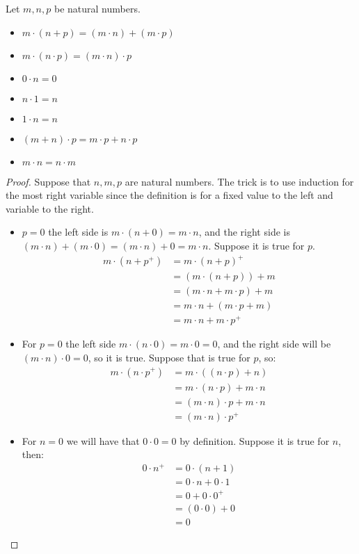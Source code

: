 \documentclass{tufte-handout}
\begin{document}
\begin{theorem}
	Let $m, n, p$ be natural numbers.
	\begin{itemize}
		\item $m \cdot (n + p) = (m \cdot n) + (m \cdot p)$
		\item $m \cdot (n \cdot p) = (m \cdot n) \cdot p$
		\item $0 \cdot n = 0$
		\item $n \cdot 1 = n$
		\item $1 \cdot n = n$
		\item $(m + n) \cdot p = m \cdot p + n \cdot p$
		\item $m \cdot n = n \cdot m$
	\end{itemize}
\end{theorem}
\begin{proof}
	Suppose that $n, m, p$ are natural numbers. The trick is to use induction for the most right variable since the definition is for a fixed value to the left and variable to the right.
	\begin{itemize}
		\item $p = 0$ the left side is $m \cdot (n + 0) = m \cdot n$, and the right side is $(m \cdot n) + (m \cdot 0) = (m\cdot n) + 0 = m\cdot n$. Suppose it is true for $p$.
		\begin{align*}
			m \cdot (n + p^+) &= m \cdot (n + p)^+\\
			&= (m \cdot (n + p)) + m\\
			&= (m \cdot n + m \cdot p) + m\\
			&= m \cdot n + (m \cdot p + m)\\
			&= m \cdot n + m \cdot p^+
		\end{align*}

		\item For $p = 0$ the left side $m \cdot (n \cdot 0) = m \cdot 0 = 0$, and the right side will be $(m \cdot n) \cdot 0 = 0$, so it is true. Suppose that is true for $p$, so:
		\begin{align*}
			m \cdot (n \cdot p^+) &= m \cdot ((n \cdot p) + n)\\
			&= m \cdot (n \cdot p) + m \cdot n\\
			&= (m \cdot n) \cdot p + m \cdot n\\
			&= (m \cdot n) \cdot p^+
		\end{align*}

		\item For $n = 0$ we will have that $0 \cdot 0 = 0$ by definition. Suppose it is true for $n$, then:
		\begin{align*}
			0 \cdot n^+ &= 0 \cdot (n + 1)\\
			&= 0 \cdot n + 0 \cdot 1\\
			&= 0 + 0 \cdot 0^+\\
			&= (0 \cdot 0) + 0\\
			&= 0
		\end{align*}


\end{itemize}
\end{proof}
\end{document}

